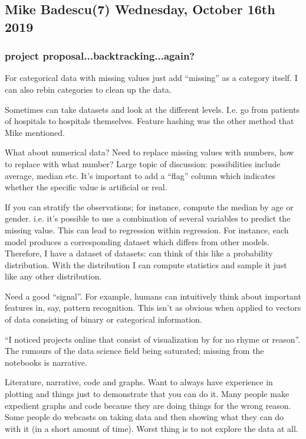 \subsection{Mike Badescu(7) Wednesday, October 16th 2019}

\subsubsection{project proposal...backtracking...again?}

For categorical data with missing values just add ``missing'' as a
category itself. I can also rebin categories to clean up the data.

Sometimes can take datasets and look at the
different levels. I.e. go from patients of hospitals to hospitals
themselves. Feature hashing was the other method that Mike mentioned.

What about numerical data? Need to replace missing values
with numbers, how
to replace with what number? Large topic of discussion:
possibilities include average, median etc. It's important
to add a ``flag'' column which indicates whether the specific value
is artificial or real.

If you can stratify the observations;
for instance, compute the median by age or
gender. i.e. it's possible to use a combination of several
variables to predict the missing value.
This can lead to regression within regression. 
For instance, each model produces a corresponding dataset
which differs from other models. Therefore, I have a dataset of 
datasets: can think of this like a probability
distribution. With the distribution I can compute statistics
and sample it just like any other distribution.

Need a good ``signal''. For example, humans can intuitively
think about important features in, say, pattern recognition.
This isn't as obvious when applied to vectors of data consisting
of binary or categorical information. 

``I noticed projects online that consist of visualization
by for no rhyme or reason''.
The rumours of the data science field being saturated;
missing from the notebooks is narrative.

Literature, narrative, code and graphs. Want to always
have experience in plotting and things just to demonstrate
that you can do it.
Many people make expedient graphs and code because
they are doing things for the wrong reason. Some people
do webcasts on taking data and then showing what they
can do with it (in a short amount of time).
Worst thing is to not explore the data at all.

